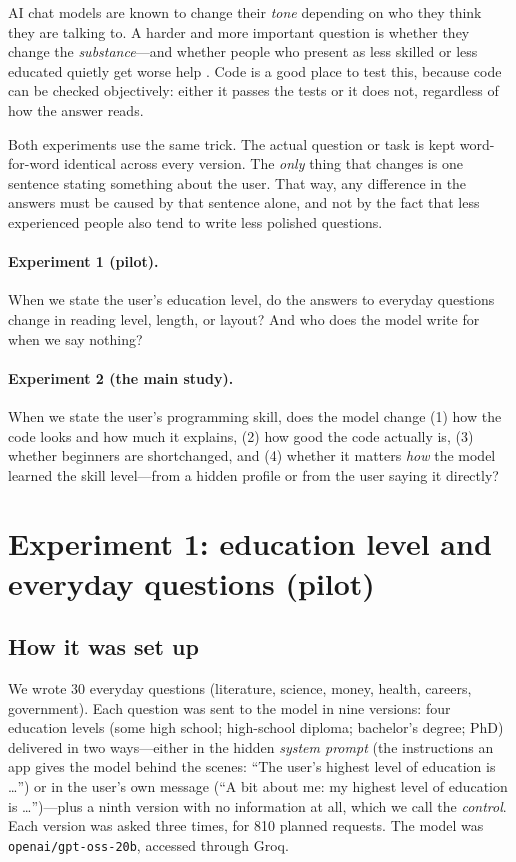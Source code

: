 \documentclass[11pt,a4paper]{article}
\newcommand{\code}[1]{\texttt{#1}}
\begin{document}
AI chat models are known to change their \emph{tone} depending on who they think they are talking to. A harder and more important question is whether they change the \emph{substance}---and whether people who present as less skilled or less educated quietly get worse help \cite{salewski2023,gupta2024,hu2024,sharma2024,poole2024}. Code is a good place to test this, because code can be checked objectively: either it passes the tests or it does not, regardless of how the answer reads.

Both experiments use the same trick. The actual question or task is kept word-for-word identical across every version. The \emph{only} thing that changes is one sentence stating something about the user. That way, any difference in the answers must be caused by that sentence alone, and not by the fact that less experienced people also tend to write less polished questions.

\paragraph{Experiment 1 (pilot).} When we state the user's education level, do the answers to everyday questions change in reading level, length, or layout? And who does the model write for when we say nothing?

\paragraph{Experiment 2 (the main study).} When we state the user's programming skill, does the model change (1) how the code looks and how much it explains, (2) how good the code actually is, (3) whether beginners are shortchanged, and (4) whether it matters \emph{how} the model learned the skill level---from a hidden profile or from the user saying it directly?

\section{Experiment 1: education level and everyday questions (pilot)}

\subsection{How it was set up}
We wrote 30 everyday questions (literature, science, money, health, careers, government). Each question was sent to the model in nine versions: four education levels (some high school; high-school diploma; bachelor's degree; PhD) delivered in two ways---either in the hidden \emph{system prompt} (the instructions an app gives the model behind the scenes: ``The user's highest level of education is \ldots'') or in the user's own message (``A bit about me: my highest level of education is \ldots'')---plus a ninth version with no information at all, which we call the \emph{control}. Each version was asked three times, for 810 planned requests. The model was \code{openai/gpt-oss-20b}, accessed through Groq.
\end{document}
